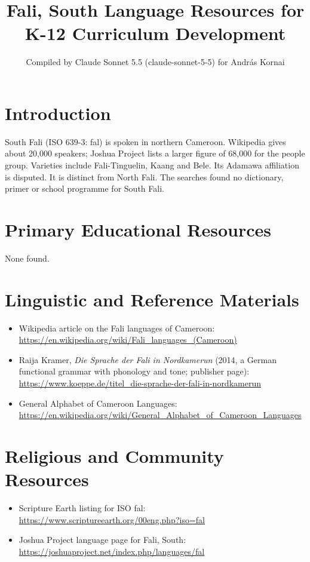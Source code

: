 \documentclass[12pt]{article}
\title{Fali, South Language Resources for K-12 Curriculum Development}
\author{Compiled by Claude Sonnet 5.5 (claude-sonnet-5-5) for Andr\'as Kornai}
\date{}
\begin{document}
\maketitle

\section{Introduction}
South Fali (ISO 639-3: fal) is spoken in northern Cameroon. Wikipedia gives about 20,000 speakers; Joshua Project lists a larger figure of 68,000 for the people group. Varieties include Fali-Tinguelin, Kaang and Bele. Its Adamawa affiliation is disputed. It is distinct from North Fali. The searches found no dictionary, primer or school programme for South Fali.

\section{Primary Educational Resources}
None found.

\section{Linguistic and Reference Materials}
\begin{itemize}
\item Wikipedia article on the Fali languages of Cameroon: \url{https://en.wikipedia.org/wiki/Fali_languages_(Cameroon)}
\item Raija Kramer, \emph{Die Sprache der Fali in Nordkamerun} (2014, a German functional grammar with phonology and tone; publisher page): \url{https://www.koeppe.de/titel_die-sprache-der-fali-in-nordkamerun}
\item General Alphabet of Cameroon Languages: \url{https://en.wikipedia.org/wiki/General_Alphabet_of_Cameroon_Languages}
\end{itemize}

\section{Religious and Community Resources}
\begin{itemize}
\item Scripture Earth listing for ISO fal: \url{https://www.scriptureearth.org/00eng.php?iso=fal}
\item Joshua Project language page for Fali, South: \url{https://joshuaproject.net/index.php/languages/fal}
\end{itemize}
\end{document}
